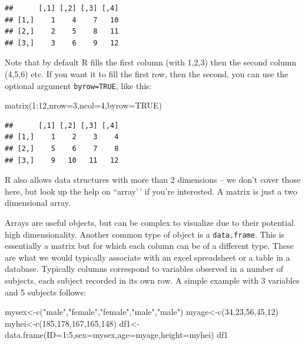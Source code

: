 \documentclass[
]{article}
\newenvironment{Shaded}{\begin{snugshade}}{\end{snugshade}}
\newcommand{\AttributeTok}[1]{\textcolor[rgb]{0.77,0.63,0.00}{#1}}
\newcommand{\ConstantTok}[1]{\textcolor[rgb]{0.00,0.00,0.00}{#1}}
\newcommand{\DecValTok}[1]{\textcolor[rgb]{0.00,0.00,0.81}{#1}}
\newcommand{\FunctionTok}[1]{\textcolor[rgb]{0.00,0.00,0.00}{#1}}
\newcommand{\NormalTok}[1]{#1}
\newcommand{\OtherTok}[1]{\textcolor[rgb]{0.56,0.35,0.01}{#1}}
\newcommand{\SpecialCharTok}[1]{\textcolor[rgb]{0.00,0.00,0.00}{#1}}
\newcommand{\StringTok}[1]{\textcolor[rgb]{0.31,0.60,0.02}{#1}}
\begin{document}
\begin{verbatim}
##      [,1] [,2] [,3] [,4]
## [1,]    1    4    7   10
## [2,]    2    5    8   11
## [3,]    3    6    9   12
\end{verbatim}

Note that by default R fills the first column (with 1,2,3) then the
second column (4,5,6) etc. If you want it to fill the first row, then
the second, you can use the optional argument \texttt{byrow=TRUE}, like
this:

\begin{Shaded}
\begin{Highlighting}[]
\FunctionTok{matrix}\NormalTok{(}\DecValTok{1}\SpecialCharTok{:}\DecValTok{12}\NormalTok{,}\AttributeTok{nrow=}\DecValTok{3}\NormalTok{,}\AttributeTok{ncol=}\DecValTok{4}\NormalTok{,}\AttributeTok{byrow=}\ConstantTok{TRUE}\NormalTok{)}
\end{Highlighting}
\end{Shaded}

\begin{verbatim}
##      [,1] [,2] [,3] [,4]
## [1,]    1    2    3    4
## [2,]    5    6    7    8
## [3,]    9   10   11   12
\end{verbatim}

R also allows data structures with more than 2 dimensions -- we don't
cover those here, but look up the help on ``array'\,' if you're
interested. A matrix is just a two dimensional array.

Arrays are useful objects, but can be complex to visualize due to their
potential high dimensionality. Another common type of object is a
\texttt{data.frame}. This is essentially a matrix but for which each
column can be of a different type. These are what we would typically
associate with an excel spreadsheet or a table in a database. Typically
columns correspond to variables observed in a number of subjects, each
subject recorded in its own row. A simple example with 3 variables and 5
subjects follows:

\begin{Shaded}
\begin{Highlighting}[]
\NormalTok{mysex}\OtherTok{\textless{}{-}}\FunctionTok{c}\NormalTok{(}\StringTok{"male"}\NormalTok{,}\StringTok{"female"}\NormalTok{,}\StringTok{"female"}\NormalTok{,}\StringTok{"male"}\NormalTok{,}\StringTok{"male"}\NormalTok{)}
\NormalTok{myage}\OtherTok{\textless{}{-}}\FunctionTok{c}\NormalTok{(}\DecValTok{34}\NormalTok{,}\DecValTok{23}\NormalTok{,}\DecValTok{56}\NormalTok{,}\DecValTok{45}\NormalTok{,}\DecValTok{12}\NormalTok{)}
\NormalTok{myhei}\OtherTok{\textless{}{-}}\FunctionTok{c}\NormalTok{(}\DecValTok{185}\NormalTok{,}\DecValTok{178}\NormalTok{,}\DecValTok{167}\NormalTok{,}\DecValTok{165}\NormalTok{,}\DecValTok{148}\NormalTok{)}
\NormalTok{df1}\OtherTok{\textless{}{-}}\FunctionTok{data.frame}\NormalTok{(}\AttributeTok{ID=}\DecValTok{1}\SpecialCharTok{:}\DecValTok{5}\NormalTok{,}\AttributeTok{sex=}\NormalTok{mysex,}\AttributeTok{age=}\NormalTok{myage,}\AttributeTok{height=}\NormalTok{myhei)}
\NormalTok{df1}
\end{Highlighting}
\end{Shaded}
\end{document}
